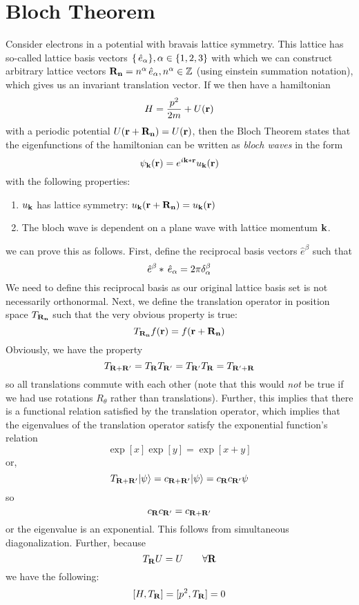 \section{Bloch Theorem}
Consider electrons in a potential with bravais lattice symmetry. This lattice has so-called lattice basis vectors \(\{\,\hat{e}_{\alpha}\},\alpha\in\{1,2,3\}\) with which we can construct arbitrary lattice vectors \(\mathbf{R}_{\mathbf{n}} = n^\alpha\,\hat{e}_{\alpha}, n^\alpha\in\mathbb{Z}\) (using einstein summation notation), which gives us an invariant translation vector. If we then have a hamiltonian
\[H =\frac{p^2}{2m}+U(\mathbf{r})\]
with a periodic potential \(U(\mathbf{r} +\mathbf{R}_{\mathbf{n}}) = U(\mathbf{r})\), then the Bloch Theorem states that the eigenfunctions of the hamiltonian can be written as \emph{bloch waves} in the form
\begin{equation}
	\psi_{\mathbf{k}}(\mathbf{r}) = e^{i\mathbf{k} *\mathbf{r}}u_{\mathbf{k}}(\mathbf{r})
\end{equation}
with the following properties:
\begin{enumerate}
	\item \(u_{\mathbf{k}}\) has lattice symmetry: \(u_{\mathbf{k}}(\mathbf{r}+\mathbf{R}_{\mathbf{n}})=  u_{\mathbf{k}}(\mathbf{r})\)
	\item The bloch wave is dependent on a plane wave with lattice momentum \(\mathbf{k}\).
\end{enumerate}
we can prove this as follows. First, define the reciprocal basis vectors \(\hat e^\beta\) such that \[\hat e^\beta*\,\hat{e}_{\alpha} = 2\pi\delta^\beta_\alpha\]We need to define this reciprocal basis as our original lattice basis set is not necessarily orthonormal. Next, we define the translation operator in position space \(T_{\mathbf{R}_{\mathbf{n}}}\) such that the very obvious property is true:
\[T_{\mathbf{R}_{\mathbf{n}}}f(\mathbf{r}) = f(\mathbf{r}+\mathbf{R}_{\mathbf{n}})\]
Obviously, we have the property
\[T_{\mathbf{R}+\mathbf{R}'} = T_{\mathbf{R}}T_{\mathbf{R}'} = T_{\mathbf{R}'}T_{\mathbf{R}}=T_{\mathbf{R}'+\mathbf{R}}\]
so all translations commute with each other (note that this would \emph{not} be true if we had use rotations \(R_\theta\) rather than translations). Further, this implies that there is a functional relation satisfied by the translation operator, which implies that the eigenvalues of the translation operator satisfy the exponential function's relation
\[\exp[x]\exp[y] = \exp[x+y]\]
or, 
\[T_{\mathbf{R}+\mathbf{R}'}\lvert\psi\rangle = c_{\mathbf{R}+\mathbf{R}'}\lvert\psi\rangle = c_{\mathbf{R}}c_{\mathbf{R}'}\psi\]
so
\[c_{\mathbf{R}}c_{\mathbf{R}'}=c_{\mathbf{R}+\mathbf{R}'}\]
or the eigenvalue is an exponential.
This follows from simultaneous diagonalization. Further, because
\[T_{\mathbf{R}}U = U \qquad \forall \mathbf{R}\]
we have the following:
\[[H, T_{\mathbf{R}}] = [p^2, T_{\mathbf{R}}] = 0\]

